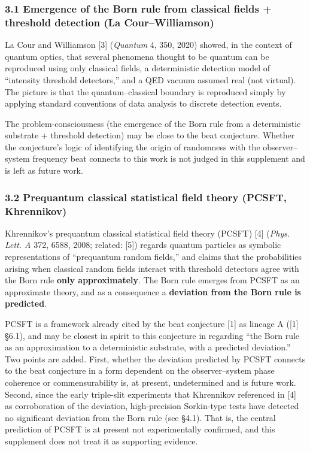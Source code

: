 \documentclass[
]{ltjsarticle}
\begin{document}
\subsubsection{3.1 Emergence of the Born rule from classical fields +
threshold detection (La
Cour--Williamson)}\label{emergence-of-the-born-rule-from-classical-fields-threshold-detection-la-courwilliamson}

La Cour and Williamson {[}3{]} (\emph{Quantum} 4, 350, 2020) showed, in
the context of quantum optics, that several phenomena thought to be
quantum can be reproduced using only classical fields, a deterministic
detection model of ``intensity threshold detectors,'' and a QED vacuum
assumed real (not virtual). The picture is that the quantum--classical
boundary is reproduced simply by applying standard conventions of data
analysis to discrete detection events.

The problem-consciousness (the emergence of the Born rule from a
deterministic substrate + threshold detection) may be close to the beat
conjecture. Whether the conjecture's logic of identifying the origin of
randomness with the observer--system frequency beat connects to this
work is not judged in this supplement and is left as future work.

\subsubsection{3.2 Prequantum classical statistical field theory (PCSFT,
Khrennikov)}\label{prequantum-classical-statistical-field-theory-pcsft-khrennikov}

Khrennikov's prequantum classical statistical field theory (PCSFT)
{[}4{]} (\emph{Phys. Lett. A} 372, 6588, 2008; related: {[}5{]}) regards
quantum particles as symbolic representations of ``prequantum random
fields,'' and claims that the probabilities arising when classical
random fields interact with threshold detectors agree with the Born rule
\textbf{only approximately}. The Born rule emerges from PCSFT as an
approximate theory, and as a consequence a \textbf{deviation from the
Born rule is predicted}.

PCSFT is a framework already cited by the beat conjecture {[}1{]} as
lineage A ({[}1{]} §6.1), and may be closest in spirit to this
conjecture in regarding ``the Born rule as an approximation to a
deterministic substrate, with a predicted deviation.'' Two points are
added. First, whether the deviation predicted by PCSFT connects to the
beat conjecture in a form dependent on the observer--system phase
coherence or commensurability is, at present, undetermined and is future
work. Second, since the early triple-slit experiments that Khrennikov
referenced in {[}4{]} as corroboration of the deviation, high-precision
Sorkin-type tests have detected no significant deviation from the Born
rule (see §4.1). That is, the central prediction of PCSFT is at present
not experimentally confirmed, and this supplement does not treat it as
supporting evidence.
\end{document}
